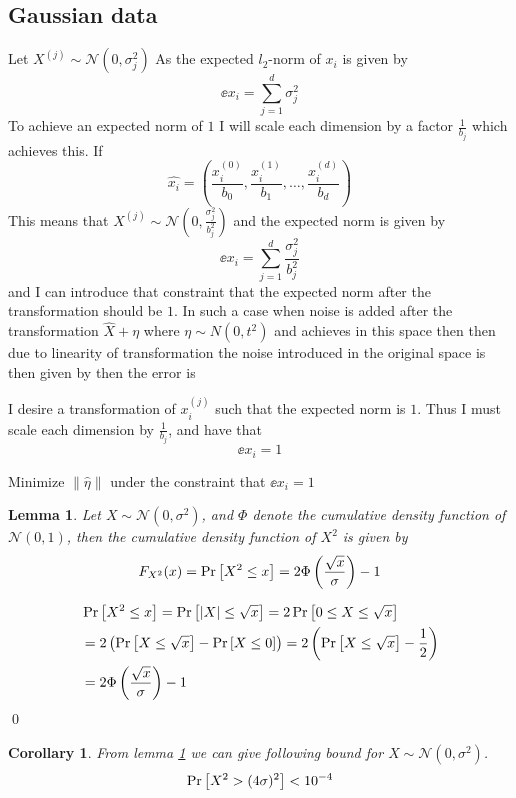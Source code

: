 \documentclass[a4paper,12pt]{article}
\renewenvironment{proof}{{\textit{Proof} \\}}{\qed}
\newtheorem{corollary}{Corollary}[section]
\newtheorem{lemma}{Lemma}[section]
\begin{document}
\subsection{Gaussian data}
Let $X^{(j)} \sim \mathcal{N}(0, \sigma_j^2)$ 
As the expected $l_2$-norm of $x_i$ is given by
\[
    \ee{x_i} = \sum_{j=1}^d \sigma_j^2
\]
To achieve an expected norm of $1$ I will scale 
each dimension by a factor $\frac{1}{b_j}$ which achieves this.
If 
\[
\hat{x_i} = \left( \frac{x_i^{(0)}}{b_0}, \frac{x_i^{(1)}}{b_1}, \dots, \frac{x_i^{(d)}}{b_d} \right)
\]
This means that $X^{(j)} \sim \mathcal{N}(0,\frac{\sigma_j^2}{b_j^2})$ 
and the expected norm is given by 
\[
    \ee{x_i} = \sum_{j=1}^d \frac{\sigma_j^2}{b_j^2}
\]
and I can introduce that constraint that the expected norm
after the transformation should be $1$.
In such a case when noise is added after the transformation
$\hat{X} + \eta$
where $\eta \sim N(0, t^2)$ and achieves \edp in this space
then then due to linearity of transformation the noise 
introduced in the original space is then given by
then the error is





I desire a transformation of $x_i^{(j)}$ such that the 
expected norm is $1$. Thus I must scale each dimension by
$\frac{1}{b_j}$, and have that 
\[
    \ee{x_i} = 1
\]

Minimize $\| \hat{\eta} \|$ under the constraint that $\ee{x_i} = 1$  

\begin{lemma}
\label{lem:chibound}
Let $X \sim \mathcal{N}(0,\sigma^2)$, and $\Phi$ denote the 
cumulative density function of $\mathcal{N}(0,1)$, then the 
cumulative density function of $X^2$ is given by
\[
    F_{X^2}(x) = \Pr\left [X^2 \le x \right] = 2\Phi \left (\frac{\sqrt{x}}{\sigma}\right) - 1
\]
\end{lemma}
\begin{proof}
\begin{align*}
    &\Pr\left [X^2 \le x \right] =
    \Pr\left [ |X| \le \sqrt{x} \right] =
    2 \Pr\left [0 \le X \le \sqrt{x} \right]  \\
    & =2  \left (\Pr\left [X \le \sqrt{x} \right] - \Pr\left [X \le 0 \right]\right) =
    2 \left (\Pr\left [X \le \sqrt{x} \right] - \frac{1}{2}\right)  \\
    &= 2 \Phi \left (\frac{\sqrt{x}}{\sigma}\right) - 1 
\end{align*}
\end{proof}
\begin{corollary}
From lemma \ref{lem:chibound} we can give following bound for $X \sim \mathcal{N}(0,\sigma^2)$.
\[
    \Pr\left [X^2 > (4\sigma)^2 \right] < 10^{-4}
\]
\end{corollary}
\end{document}
